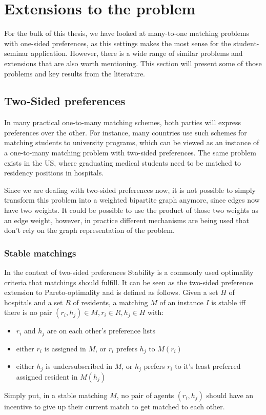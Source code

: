 \section{Extensions to the problem}
For the bulk of this thesis, we have looked at many-to-one matching problems with one-sided preferences, as this settings makes the most sense for the student-seminar application. However, there is a wide range of similar problems and extensions that are also worth mentioning. This section will present some of those problems and key results from the literature. 

\subsection{Two-Sided preferences}
In many practical one-to-many matching schemes, both parties will express preferences over the other. For instance, many countries use such schemes for matching students to university programs, which can be viewed as an instance of a one-to-many matching problem with two-sided preferences. The same problem exists in the US, where graduating medical students need to be matched to residency positions in hospitals. 

Since we are dealing with two-sided preferences now, it is not possible to simply transform this problem into a weighted bipartite graph anymore, since edges now have two weights. It could be possible to use the product of those two weights as an edge weight, however, in practice different mechanisms are being used that don't rely on the graph representation of the problem.

\subsubsection{Stable matchings}
In the context of two-sided preferences Stability is a commonly used optimality criteria that matchings should fulfill. It can be seen as the two-sided preference extension to Pareto-optimality and is defined as follows. Given a set $H$ of hospitals and a set $R$ of residents, a matching $M$ of an instance $I$ is stable iff there is no pair $(r_i, h_j) \in M, r_i \in R, h_j \in H$ with:
\begin{itemize}
    \item $r_i$ and $h_j$ are on each other's preference lists
    \item either $r_i$ is assigned in $M$, or $r_i$ prefers $h_j$ to $M(r_i)$
    \item either $h_j$ is undersubscribed in $M$, or $h_j$ prefers $r_i$ to it's least preferred assigned resident in $M(h_j)$
\end{itemize}
Simply put, in a stable matching $M$, no pair of agents $(r_i, h_j)$ should have an incentive to give up their current match to get matched to each other.

